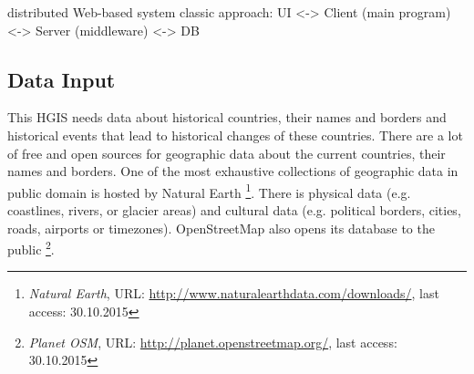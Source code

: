 distributed Web-based system
classic approach: UI <-> Client (main program) <-> Server (middleware) <-> DB

\subsection{Data Input} %
\label{sub:input}

This HGIS needs data about historical countries, their names and borders and historical events that lead to historical changes of these countries. There are a lot of free and open sources for geographic data about the current countries, their names and borders. One of the most exhaustive collections of geographic data in public domain is hosted by Natural Earth
\footnote{
  \textit{Natural Earth},
  URL: \url{http://www.naturalearthdata.com/downloads/},
  last access: 30.10.2015
}.
There is physical data (e.g. coastlines, rivers, or glacier areas) and cultural data (e.g. political borders, cities, roads, airports or timezones). OpenStreetMap also opens its database to the public
\footnote{
  \textit{Planet OSM},
  URL: \url{http://planet.openstreetmap.org/},
  last access: 30.10.2015
}.

